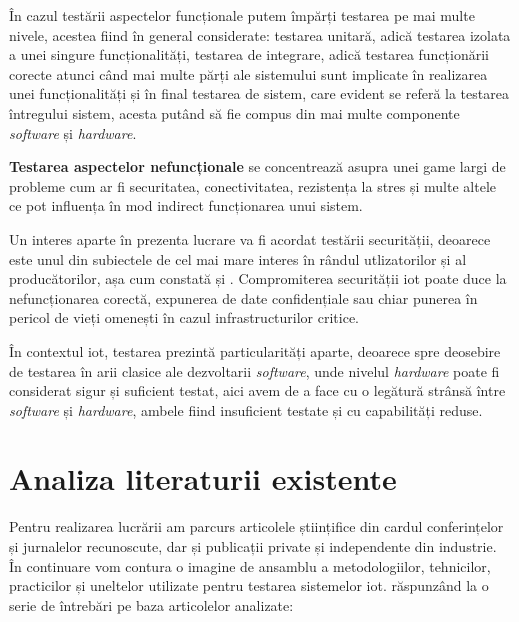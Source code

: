În cazul testării aspectelor funcționale putem împărți testarea pe mai multe nivele, acestea fiind în general considerate: testarea unitară, adică testarea izolata a unei singure funcționalități, testarea de integrare, adică testarea funcționării corecte atunci când mai multe părți ale sistemului sunt implicate în realizarea unei funcționalități și în final testarea de sistem, care evident se referă la testarea întregului sistem, acesta putând să fie compus din mai multe componente \textit{software} și \textit{hardware}.

\textbf{Testarea aspectelor nefuncționale} se concentrează asupra unei game largi de probleme cum ar fi securitatea, conectivitatea, rezistența la stres și multe altele ce pot influența în mod indirect funcționarea unui sistem.


Un interes aparte în prezenta lucrare va fi acordat testării securității, deoarece este unul din subiectele de cel mai mare interes în rândul utlizatorilor și al producătorilor, așa cum constată \citet{Ahmed2019} și \citet{Lee2015}. Compromiterea securității \acrshort{iot} poate duce la nefuncționarea corectă, expunerea de date confidențiale sau chiar punerea în pericol de vieți omenești în cazul infrastructurilor critice.


În contextul \acrshort{iot}, testarea prezintă particularități aparte, deoarece spre deosebire de testarea în arii clasice ale dezvoltarii \textit{software}, unde nivelul \textit{hardware} poate fi considerat sigur și suficient testat, aici avem de a face cu o legătură strânsă între \textit{software} și \textit{hardware}, ambele fiind insuficient testate și cu capabilități reduse.


\section{Analiza literaturii existente}

Pentru realizarea lucrării am parcurs articolele științifice din cardul conferințelor și jurnalelor recunoscute, dar și publicații private și independente din industrie. În continuare vom contura o imagine de ansamblu a metodologiilor, tehnicilor, practicilor și uneltelor utilizate pentru testarea sistemelor \acrshort{iot}. răspunzând la o serie de întrebări pe baza articolelor analizate: 

